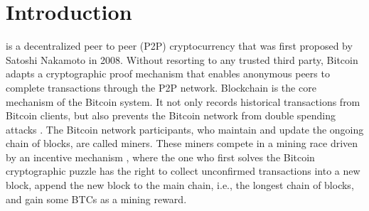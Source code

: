 \documentclass[10pt,journal,compsoc, twoside]{IEEEtran}
\begin{document}
\maketitle
\IEEEdisplaynontitleabstractindextext
\IEEEpeerreviewmaketitle


\ifCLASSOPTIONcompsoc
{}
\else
\section{Introduction}
\label{sec:introduction}
\fi



 \cite{nakamoto2008bitcoin} is a decentralized peer to peer (P2P) cryptocurrency that was first proposed by Satoshi Nakamoto in 2008. Without resorting to any trusted third party, Bitcoin adapts a cryptographic proof mechanism that enables anonymous peers to complete transactions through the P2P network. Blockchain is the core mechanism of the Bitcoin system. It not only records historical transactions from Bitcoin clients, but also prevents the Bitcoin network from double spending attacks \cite{karame2015misbehavior}. The Bitcoin network participants, who maintain and update the ongoing chain of blocks, are called miners. These miners compete in a mining race driven by an incentive mechanism \cite{lewenberg2015bitcoin, schrijvers2016incentive}, where the one who first solves the Bitcoin cryptographic puzzle \cite{giechaskiel2016bitcoin} has the right to collect unconfirmed transactions into a new block, append the new block to the main chain, i.e., the longest chain of blocks, and gain some BTCs \cite{BTC} as a mining reward.
\end{document}
